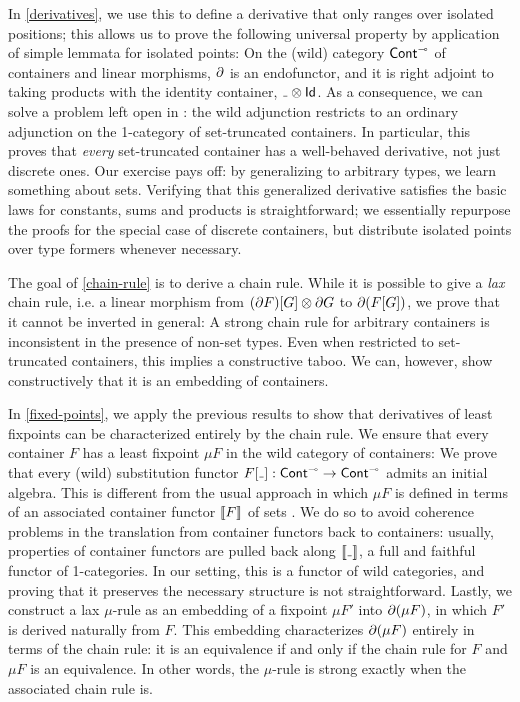 In \autoref{derivatives}, we use this to define a derivative that only ranges over isolated positions;
this allows us to prove the following universal property
by application of simple lemmata for isolated points:
On the (wild) category \( \operatorname{\operatorname{\mathsf{Cont}}}^{{\scriptscriptstyle\multimap}} \) of containers and linear morphisms,
\( \partial \) is an endofunctor,
and it is right adjoint to taking products with the identity container, \( \Maybe{\Blank} \).
As a consequence, we can solve a problem left open in \cite[14]{AbbottEtAl2005DataDifferentiating}:
the wild adjunction restricts to an ordinary adjunction on the 1-category of set-truncated containers.
In particular, this proves that \emph{every} set-truncated container has a well-behaved derivative, not just discrete ones.
Our exercise pays off: by generalizing to arbitrary types, we learn something about sets.
Verifying that this generalized derivative satisfies the basic laws for constants, sums and products is straightforward;
we essentially repurpose the proofs for the special case of discrete containers,
but distribute isolated points over type formers whenever necessary.

The goal of \autoref{chain-rule} is to derive a chain rule.
While it is possible to give a \emph{lax} chain rule, i.e. a linear morphism
from
\( (\partial{F})\lbrack G\rbrack \mathbin{\otimes} \partial{G} \)
to
\( \partial{(F\lbrack G\rbrack)} \),
we prove that it cannot be inverted in general:
A strong chain rule for arbitrary containers is inconsistent in the presence of non-set types.
Even when restricted to set-truncated containers, this implies a constructive taboo.
We can, however, show constructively that it is an embedding of containers.

In \autoref{fixed-points}, we apply the previous results to show that derivatives of least fixpoints can be characterized entirely by the chain rule.
We ensure that every container \( F \) has a least fixpoint \( \mu F \) in the wild category of containers:
We prove that every (wild) substitution functor \( \Subst{F}{\Blank} : \ContCart \to \ContCart \) admits an initial algebra.
This is different from the usual approach in which \( \mu F \) is defined in terms of an associated container functor \( \llbracket F\rrbracket \) of sets \cite{AbbottEtAl2005ContainersConstructingstrictly,DamatoEtAl2025FormalisingInductiveCoinductive}.
We do so to avoid coherence problems in the translation from container functors back to containers:
usually, properties of container functors are pulled back along \( \Ext{\Blank} \), a full and faithful functor of 1-categories.
In our setting, this is a functor of wild categories, and proving that it preserves the necessary structure is not straightforward.
Lastly, we construct a lax \( \mu \)-rule as an embedding of a fixpoint \( \mu F' \) into \( \partial(\mu F) \), in which \( F' \) is derived naturally from \( F \).
This embedding characterizes \( \partial(\mu F) \) entirely in terms of the chain rule:
it is an equivalence if and only if the chain rule for \( F \) and \( \mu F \) is an equivalence.
In other words, the \( \mu \)-rule is strong exactly when the associated chain rule is.

